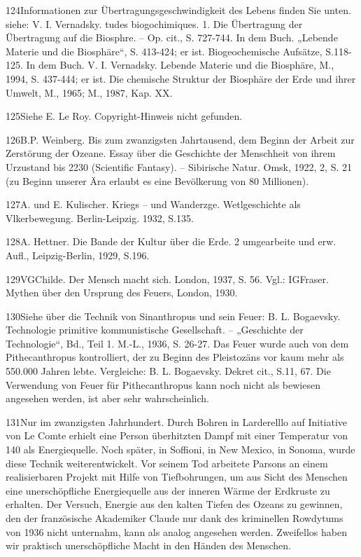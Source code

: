 \documentclass[11pt,a4paper]{book}
\begin{document}
124Informationen zur Übertragungsgeschwindigkeit des Lebens finden Sie unten. siehe: V. I. Vernadsky. tudes biogochimiques. 1. Die Übertragung der Übertragung auf die Biosphre. -- Op. cit., S. 727-744. In dem Buch. „Lebende Materie und die Biosphäre“, S. 413-424; er ist. Biogeochemische Aufsätze, S.118-125. In dem Buch. V. I. Vernadsky. Lebende Materie und die Biosphäre, M., 1994, S. 437-444; er ist. Die chemische Struktur der Biosphäre der Erde und ihrer Umwelt, M., 1965; M., 1987, Kap. XX.



125Siehe E. Le Roy. Copyright-Hinweis nicht gefunden.



126B.P. Weinberg. Bis zum zwanzigsten Jahrtausend, dem Beginn der Arbeit zur Zerstörung der Ozeane. Essay über die Geschichte der Menschheit von ihrem Urzustand bis 2230 (Scientific Fantasy). -- Sibirische Natur. Omsk, 1922, 2, S. 21 (zu Beginn unserer Ära erlaubt es eine Bevölkerung von 80 Millionen).



127A. und E. Kulischer. Kriegs -- und Wanderzge. Wetlgeschichte als Vlkerbewegung. Berlin-Leipzig. 1932, S.135.



128A. Hettner. Die Bande der Kultur über die Erde. 2 umgearbeite und erw. Aufl., Leipzig-Berlin, 1929, S.196.



129VGChilde. Der Mensch macht sich. London, 1937, S. 56. Vgl.: IGFraser. Mythen über den Ursprung des Feuers, London, 1930.



130Siehe über die Technik von Sinanthropus und sein Feuer: B. L. Bogaevsky. Technologie primitive kommunistische Gesellschaft. -- „Geschichte der Technologie“, Bd., Teil 1. M.-L., 1936, S. 26-27. Das Feuer wurde auch von dem Pithecanthropus kontrolliert, der zu Beginn des Pleistozäns vor kaum mehr als 550.000 Jahren lebte. Vergleiche: B. L. Bogaevsky. Dekret cit., S.11, 67. Die Verwendung von Feuer für Pithecanthropus kann noch nicht als bewiesen angesehen werden, ist aber sehr wahrscheinlich.



131Nur im zwanzigsten Jahrhundert. Durch Bohren in Larderelllo auf Initiative von Le Comte erhielt eine Person überhitzten Dampf mit einer Temperatur von 140 als Energiequelle. Noch später, in Soffioni, in New Mexico, in Sonoma, wurde diese Technik weiterentwickelt. Vor seinem Tod arbeitete Parsons an einem realisierbaren Projekt mit Hilfe von Tiefbohrungen, um aus Sicht des Menschen eine unerschöpfliche Energiequelle aus der inneren Wärme der Erdkruste zu erhalten. Der Versuch, Energie aus den kalten Tiefen des Ozeans zu gewinnen, den der französische Akademiker Claude nur dank des kriminellen Rowdytums von 1936 nicht unternahm, kann als analog angesehen werden. Zweifellos haben wir praktisch unerschöpfliche Macht in den Händen des Menschen.
\end{document}
